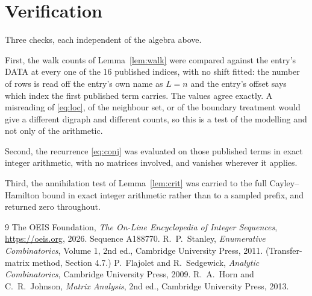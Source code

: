 \documentclass[11pt,a4paper]{article}
\theoremstyle{plain}
\theoremstyle{definition}
\begin{document}
\section{Verification}

Three checks, each independent of the algebra above.

First, the walk counts of Lemma~\ref{lem:walk} were compared against the entry's DATA at
every one of the $16$ published indices, with no shift fitted: the number of rows is
read off the entry's own name as $L=n$ and the entry's offset says which index the first
published term carries. The values agree exactly. A misreading of \eqref{eq:loc}, of the
neighbour set, or of the boundary treatment would give a different digraph and different
counts, so this is a test of the modelling and not only of the arithmetic.

Second, the recurrence \eqref{eq:conj} was evaluated on those published terms in exact
integer arithmetic, with no matrices involved, and vanishes wherever it applies.

Third, the annihilation test of Lemma~\ref{lem:crit} was carried to the full
Cayley--Hamilton bound in exact integer arithmetic rather than to a sampled prefix, and
returned zero throughout.

\begin{thebibliography}{9}
 The OEIS Foundation, \emph{The On-Line Encyclopedia of Integer
Sequences}, \url{https://oeis.org}, 2026. Sequence A188770.
 R.~P.~Stanley, \emph{Enumerative Combinatorics}, Volume 1, 2nd ed.,
Cambridge University Press, 2011. (Transfer-matrix method, Section 4.7.)
 P.~Flajolet and R.~Sedgewick, \emph{Analytic Combinatorics}, Cambridge
University Press, 2009.
 R.~A.~Horn and C.~R.~Johnson, \emph{Matrix Analysis}, 2nd ed., Cambridge
University Press, 2013.
\end{thebibliography}
\end{document}
